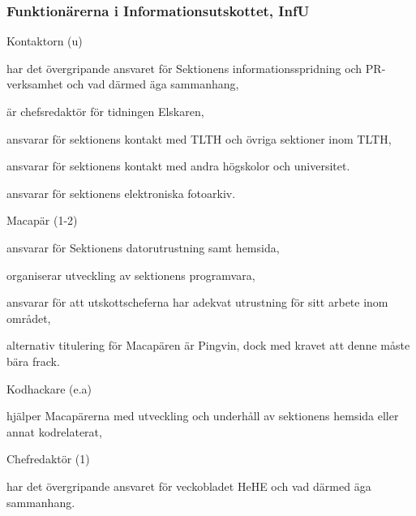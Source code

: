 \documentclass[10pt]{article}
\begin{document}
\subsubsection{Funktionärerna i Informationsutskottet, InfU}
\begin{emptylist}
    \item Kontaktorn (u)
        \begin{dashlist}
            \item har det övergripande ansvaret för Sektionens
                informationsspridning och PR-verksamhet och vad därmed
                äga sammanhang,
            \item är chefsredaktör för tidningen Elskaren,
            \item ansvarar för sektionens kontakt med TLTH och övriga
                sektioner inom TLTH,
            \item ansvarar för sektionens kontakt med andra högskolor
                och universitet.
             \item ansvarar för sektionens elektroniska fotoarkiv.
        \end{dashlist}
    \item Macapär (1-2)
        \begin{dashlist}
            \item ansvarar för Sektionens datorutrustning samt hemsida,
            \item organiserar utveckling av sektionens programvara,
            \item ansvarar för att utskottscheferna har adekvat utrustning
                för sitt arbete inom området,
            \item alternativ titulering för Macapären är Pingvin, dock
                med kravet att denne måste bära frack.
        \end{dashlist}
	\item Kodhackare (e.a)
        \begin{dashlist}
            \item hjälper Macapärerna med utveckling och underhåll av
                sektionens hemsida eller annat kodrelaterat,
        \end{dashlist}
    \item Chefredaktör (1)
    		\begin{dashlist}
    			\item har det övergripande ansvaret för veckobladet HeHE och vad därmed äga sammanhang.
    		\end{dashlist}

\end{emptylist}
\end{document}
